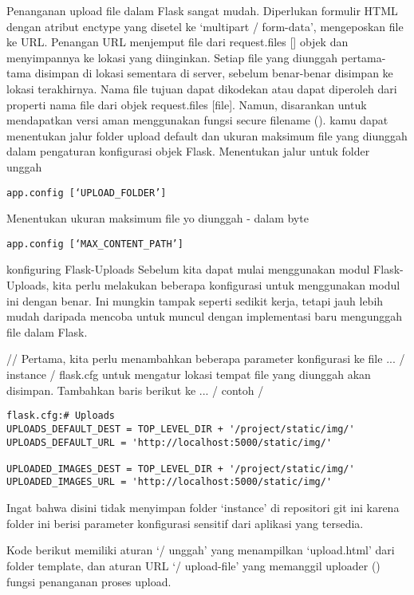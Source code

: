 \documentclass[12pt,a4paper]{article}
\begin{document}
Penanganan upload file dalam Flask sangat mudah. Diperlukan formulir HTML dengan atribut enctype yang disetel ke ‘multipart / form-data’, mengeposkan file ke URL. Penangan URL menjemput file dari request.files [] objek dan menyimpannya ke lokasi yang diinginkan.
	Setiap file yang diunggah pertama-tama disimpan di lokasi sementara di server, sebelum benar-benar disimpan ke lokasi terakhirnya. Nama file tujuan dapat dikodekan atau dapat diperoleh dari properti nama file dari objek request.files [file]. Namun, disarankan untuk mendapatkan versi aman menggunakan fungsi secure filename ().
kamu dapat menentukan jalur folder upload default dan ukuran maksimum file yang diunggah dalam pengaturan konfigurasi objek Flask.
Menentukan jalur untuk folder unggah
\begin{verbatim}
app.config [‘UPLOAD_FOLDER’] 
\end{verbatim}
Menentukan ukuran maksimum file yo diunggah - dalam byte
\begin{verbatim}
app.config [‘MAX_CONTENT_PATH’] 
\end{verbatim}



konfiguring Flask-Uploads
Sebelum kita dapat mulai menggunakan modul Flask-Uploads, kita perlu melakukan beberapa konfigurasi untuk menggunakan modul ini dengan benar. Ini mungkin tampak seperti sedikit kerja, tetapi jauh lebih mudah daripada mencoba untuk muncul dengan implementasi baru mengunggah file dalam Flask.

// Pertama, kita perlu menambahkan beberapa parameter konfigurasi ke file ... / instance / flask.cfg untuk mengatur lokasi tempat file yang diunggah akan disimpan. Tambahkan baris berikut ke ... / contoh / 

\begin{verbatim}
flask.cfg:# Uploads
UPLOADS_DEFAULT_DEST = TOP_LEVEL_DIR + '/project/static/img/'
UPLOADS_DEFAULT_URL = 'http://localhost:5000/static/img/'
 
UPLOADED_IMAGES_DEST = TOP_LEVEL_DIR + '/project/static/img/'
UPLOADED_IMAGES_URL = 'http://localhost:5000/static/img/'
\end{verbatim}
Ingat bahwa disini tidak menyimpan folder ‘instance’ di repositori git ini karena folder ini berisi parameter konfigurasi sensitif dari aplikasi yang tersedia.

Kode berikut memiliki aturan ‘/ unggah’ yang menampilkan ‘upload.html’ dari folder template, dan aturan URL ‘/ upload-file’ yang memanggil uploader () fungsi penanganan proses upload.
\end{document}
